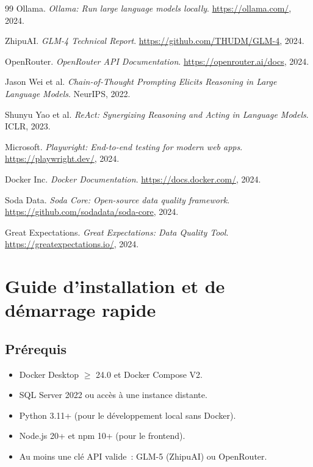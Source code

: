 \documentclass[12pt, a4paper]{report}
\begin{document}
\begin{thebibliography}{99}
Ollama.
\textit{Ollama: Run large language models locally}.
\url{https://ollama.com/}, 2024.

ZhipuAI.
\textit{GLM-4 Technical Report}.
\url{https://github.com/THUDM/GLM-4}, 2024.

OpenRouter.
\textit{OpenRouter API Documentation}.
\url{https://openrouter.ai/docs}, 2024.

Jason Wei et al.
\textit{Chain-of-Thought Prompting Elicits Reasoning in Large
Language Models}.
NeurIPS, 2022.

Shunyu Yao et al.
\textit{ReAct: Synergizing Reasoning and Acting in Language Models}.
ICLR, 2023.

Microsoft.
\textit{Playwright: End-to-end testing for modern web apps}.
\url{https://playwright.dev/}, 2024.

Docker Inc.
\textit{Docker Documentation}.
\url{https://docs.docker.com/}, 2024.

Soda Data.
\textit{Soda Core: Open-source data quality framework}.
\url{https://github.com/sodadata/soda-core}, 2024.

Great Expectations.
\textit{Great Expectations: Data Quality Tool}.
\url{https://greatexpectations.io/}, 2024.

\end{thebibliography}

\cleardoublepage

\appendix

\chapter{Guide d'installation et de démarrage rapide}
\label{ann:install}

\section{Prérequis}
\begin{itemize}
  \item Docker Desktop $\geq$ 24.0 et Docker Compose V2.
  \item SQL Server 2022 ou accès à une instance distante.
  \item Python 3.11+ (pour le développement local sans Docker).
  \item Node.js 20+ et npm 10+ (pour le frontend).
  \item Au moins une clé API valide~: GLM-5 (ZhipuAI) ou OpenRouter.
\end{itemize}
\end{document}
